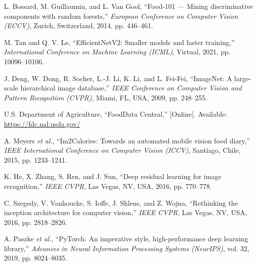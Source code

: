 \documentclass[12pt,a4paper]{article}
\begin{document}
\begin{enumerate}[label={[\arabic*]}, leftmargin=1cm]
\item L. Bossard, M. Guillaumin, and L. Van Gool, ``Food-101 --- Mining discriminative components with random forests,'' \textit{European Conference on Computer Vision (ECCV)}, Zurich, Switzerland, 2014, pp. 446--461.

\item M. Tan and Q. V. Le, ``EfficientNetV2: Smaller models and faster training,'' \textit{International Conference on Machine Learning (ICML)}, Virtual, 2021, pp. 10096--10106.

\item J. Deng, W. Dong, R. Socher, L.-J. Li, K. Li, and L. Fei-Fei, ``ImageNet: A large-scale hierarchical image database,'' \textit{IEEE Conference on Computer Vision and Pattern Recognition (CVPR)}, Miami, FL, USA, 2009, pp. 248--255.

\item U.S. Department of Agriculture, ``FoodData Central,'' [Online]. Available: \url{https://fdc.nal.usda.gov/}

\item A. Meyers \textit{et al.}, ``Im2Calories: Towards an automated mobile vision food diary,'' \textit{IEEE International Conference on Computer Vision (ICCV)}, Santiago, Chile, 2015, pp. 1233--1241.

\item K. He, X. Zhang, S. Ren, and J. Sun, ``Deep residual learning for image recognition,'' \textit{IEEE CVPR}, Las Vegas, NV, USA, 2016, pp. 770--778.

\item C. Szegedy, V. Vanhoucke, S. Ioffe, J. Shlens, and Z. Wojna, ``Rethinking the inception architecture for computer vision,'' \textit{IEEE CVPR}, Las Vegas, NV, USA, 2016, pp. 2818--2826.

\item A. Paszke \textit{et al.}, ``PyTorch: An imperative style, high-performance deep learning library,'' \textit{Advances in Neural Information Processing Systems (NeurIPS)}, vol. 32, 2019, pp. 8024--8035.
\end{enumerate}
\end{document}
